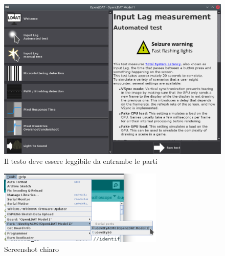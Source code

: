 \documentclass[12pt]{report}
\begin{document}
	\begin{figure}[H]
		\centering
		\includegraphics[width=\textwidth]{Applicazione_files/gui_mainMenu2.png}
		\caption{Il testo deve essere leggibile da entrambe le parti}
		\label{fig:screen2}
	\end{figure}
	\begin{figure}[H]
		\centering
		\includegraphics[width=0.7\textwidth]{Dispositivo_files/flashing_03.png}
		\caption{Screenshot chiaro}
		\label{fig:screen3}
	\end{figure}
	\lipsum[5]
\end{document}
